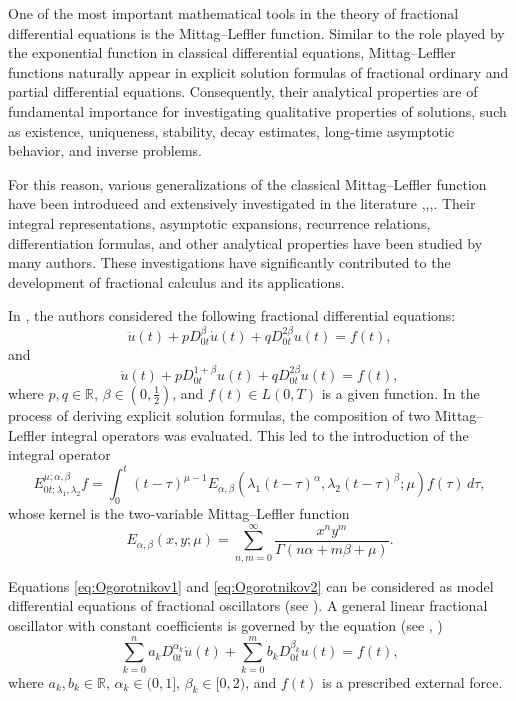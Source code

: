 \documentclass[12pt, reqno]{amsart}
\theoremstyle{definition}
\theoremstyle{remark}
\numberwithin{equation}{section}
\begin{document}
One of the most important mathematical tools in the theory of fractional differential equations is the Mittag--Leffler function. Similar to the role played by the exponential function in classical differential equations, Mittag--Leffler functions naturally appear in explicit solution formulas of fractional ordinary and partial differential equations. Consequently, their analytical properties are of fundamental importance for investigating qualitative properties of solutions, such as existence, uniqueness, stability, decay estimates, long-time asymptotic behavior, and inverse problems.

For this reason, various generalizations of the classical Mittag--Leffler function have been introduced and extensively investigated in the literature \cite{Gorenflo},\cite{Kilbas},\cite{Miller},\cite{Podlubny}. Their integral representations, asymptotic expansions, recurrence relations, differentiation formulas, and other analytical properties have been studied by many authors. These investigations have significantly contributed to the development of fractional calculus and its applications.

In \cite{Ogorodnikov1}, the authors considered the following fractional differential equations:
\begin{equation}
\ddot{u}(t)+pD_{0t}^{\beta}\dot{u}(t)+qD_{0t}^{2\beta}u(t)=f(t),
\label{eq:Ogorotnikov1}
\end{equation}
and
\begin{equation}
\ddot{u}(t)+pD_{0t}^{1+\beta}u(t)+qD_{0t}^{2\beta}u(t)=f(t),
\label{eq:Ogorotnikov2}
\end{equation}
where \(p,q\in\mathbb{R}\), \(\beta\in(0,\frac12)\), and \(f(t)\in L(0,T)\) is a given function.
 In the process of deriving explicit
solution formulas, the composition of two Mittag--Leffler integral operators was
evaluated. This led to the introduction of the integral operator
\[
E^{\mu;\alpha,\beta}_{0t;\lambda_1,\lambda_2}f
=
\int_0^t
(t-\tau)^{\mu-1}
E_{\alpha,\beta}\!\left(
\lambda_1(t-\tau)^\alpha,
\lambda_2(t-\tau)^\beta;\mu
\right)
f(\tau)\,d\tau,
\]
whose kernel is the two-variable Mittag--Leffler function
\[
E_{\alpha,\beta}(x,y;\mu)
=
\sum_{n,m=0}^{\infty}
\frac{x^n y^m}
{\Gamma(n\alpha+m\beta+\mu)}.
\]


Equations \eqref{eq:Ogorotnikov1} and \eqref{eq:Ogorotnikov2} can be considered as model differential equations of fractional oscillators (see \cite{Machado}). 
A general linear fractional oscillator with constant coefficients is governed by the equation (see \cite{Ogorodnikov1}, \cite{Ogorodnikov2})
\begin{equation}\label{eq:ogorotnikov3}
\sum_{k=0}^{n}a_kD_{0t}^{\alpha_k}\dot{u}(t)
+
\sum_{k=0}^{m}b_kD_{0t}^{\beta_k}u(t)
=
f(t),
\end{equation}
where \(a_k,b_k\in\mathbb{R}\), \(\alpha_k\in(0,1]\), \(\beta_k\in[0,2)\), and \(f(t)\) is a prescribed external force. 
\end{document}
